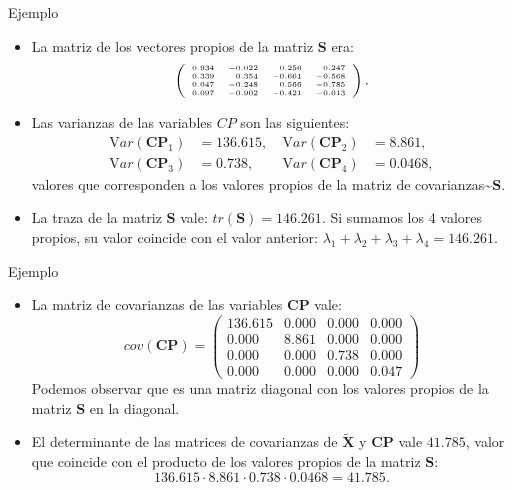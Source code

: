 \documentclass[
  spanish,
  ignorenonframetext,
]{beamer}
\providecommand{\tightlist}{%
  \setlength{\itemsep}{0pt}\setlength{\parskip}{0pt}}
\begin{document}
\begin{frame}{Ejemplo}
\protect\hypertarget{ejemplo-11}{}
\begin{itemize}
\tightlist
\item
  La matriz de los vectores propios de la matriz \(\mathbf{S}\) era: \[
  {\tiny 
  \left(
  \begin{array}{rrrr}
  0.934 & -0.022 & 0.256 & 0.247 \\
   0.339 & 0.354 & -0.661 & -0.568 \\
   0.047 & -0.248 & 0.566 & -0.785 \\
   0.097 & -0.902 & -0.421 & -0.013 
  \end{array}\right).}
  \]
\item
  Las varianzas de las variables \(CP\) son las siguientes: \[
  \begin{array}{llcll}
  {\mathrm Var}(\mathbf{CP}_1) & =  136.615,\ & {\mathrm Var}(\mathbf{CP}_2) & =  8.861,\\ 
  {\mathrm Var}(\mathbf{CP}_3) & =  0.738,\   &{\mathrm Var}(\mathbf{CP}_4) & =  0.0468,
  \end{array}
  \] valores que corresponden a los valores propios de la matriz de
  covarianzas\textasciitilde{}\(\mathbf{S}\).
\item
  La traza de la matriz \(\mathbf{S}\) vale: \(tr(\mathbf{S})=146.261\).
  Si sumamos los 4 valores propios, su valor coincide con el valor
  anterior: \(\lambda_1 + \lambda_2+ \lambda_3 + \lambda_4 = 146.261\).
\end{itemize}
\end{frame}

\begin{frame}{Ejemplo}
\protect\hypertarget{ejemplo-12}{}
\begin{itemize}
\tightlist
\item
  La matriz de covarianzas de las variables \(\mathbf{CP}\) vale: \[
  cov(\mathbf{CP})=
  \left(
  \begin{array}{rrrr}
  136.615 & 0.000 & 0.000 & 0.000 \\
   0.000 & 8.861 & 0.000 & 0.000 \\
   0.000 & 0.000 & 0.738 & 0.000 \\
   0.000 & 0.000 & 0.000 & 0.047 
  \end{array}
  \right)
  \] Podemos observar que es una matriz diagonal con los valores propios
  de la matriz \(\mathbf{S}\) en la diagonal.
\item
  El determinante de las matrices de covarianzas de
  \(\tilde{\mathbf{X}}\) y \(\mathbf{CP}\) vale \(41.785\), valor que
  coincide con el producto de los valores propios de la matriz
  \(\mathbf{S}\): \[
  136.615\cdot 8.861\cdot 0.738\cdot 0.0468 = 41.785.
  \]
\end{itemize}
\end{frame}
\end{document}
